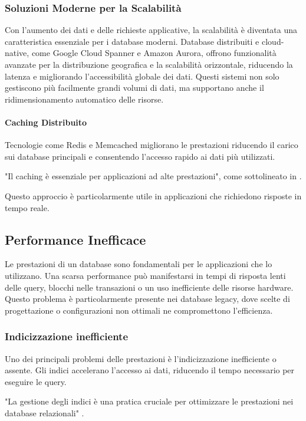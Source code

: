 \subsubsection{Soluzioni Moderne per la Scalabilità}
Con l’aumento dei dati e delle richieste applicative, la scalabilità è diventata una caratteristica essenziale per i database moderni. Database distribuiti e cloud-native, come Google Cloud Spanner e Amazon Aurora, offrono funzionalità avanzate per la distribuzione geografica e la scalabilità orizzontale, riducendo la latenza e migliorando l’accessibilità globale dei dati. Questi sistemi non solo gestiscono più facilmente grandi volumi di dati, ma supportano anche il ridimensionamento automatico delle risorse.

\paragraph{Caching Distribuito}
Tecnologie come Redis e Memcached migliorano le prestazioni riducendo il carico sui database principali e consentendo l'accesso rapido ai dati più utilizzati. 

"Il caching è essenziale per applicazioni ad alte prestazioni", come sottolineato in \cite{Dea08}.


Questo approccio è particolarmente utile in applicazioni che richiedono risposte in tempo reale.

\subsection{Performance Inefficace}
Le prestazioni di un database sono fondamentali per le applicazioni che lo utilizzano. Una scarsa performance può manifestarsi in tempi di risposta lenti delle query, blocchi nelle transazioni o un uso inefficiente delle risorse hardware. Questo problema è particolarmente presente nei database legacy, dove scelte di progettazione o configurazioni non ottimali ne compromettono l'efficienza.

\subsubsection{Indicizzazione inefficiente}
Uno dei principali problemi delle prestazioni è l'indicizzazione inefficiente o assente. Gli indici accelerano l'accesso ai dati, riducendo il tempo necessario per eseguire le query.

"La gestione degli indici è una pratica cruciale per ottimizzare le prestazioni nei database relazionali" \cite{Elm17}.

